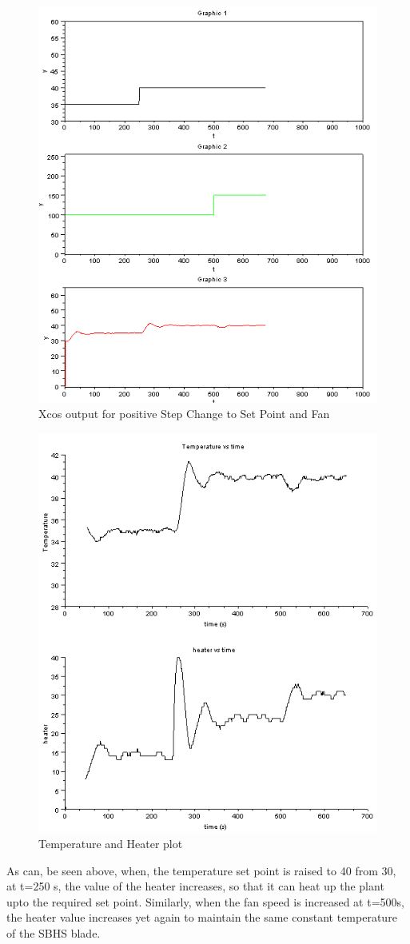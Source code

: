 \begin{figure}[H]
\centering
  \includegraphics[width=0.8\linewidth]{mpc/1_1.png}
  \caption{Xcos output for positive Step Change to Set Point and Fan}
\end{figure}
\begin{figure}[H]
\centering
  \includegraphics[width=0.8\linewidth]{mpc/1_1_heater_final.png}
  \caption{Temperature and Heater plot}
\end{figure}
As can, be seen above, when, the temperature set point is raised to 40 from 30, at t=250 s, the value of the heater increases, so that it can heat up the plant upto the required set point. Similarly, when the fan speed is increased at t=500s, the heater value increases yet again to maintain the same constant temperature of the SBHS blade. 


